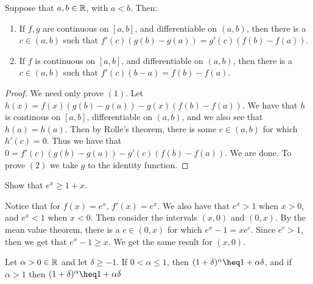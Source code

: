 \begin{theorem}\label{4.3.2}
    Suppose that $a,b \in \mathbb{R}$, with  $a<b$. Then:
        \begin{enumerate}[label=(\arabic*)]
            \item If $f, g$ are continuous on  $[a,b]$, and differentiable on  $(a,b)$, then 
                there is a $c \in (a,b)$ such that $f'(c)(g(b)-g(a))=g'(c)(f(b)-f(a))$.

            \item If $f$ is continuous on  $[a,b]$, and differentiable on  $(a,b)$, then there is 
                a  $c \in (a,b)$ such that $f'(c)(b-a)=f(b)-f(a)$.
        \end{enumerate}
\end{theorem}
\begin{proof}
    We need only prove $(1)$. Let  $h(x)=f(x)(g(b)-g(a))-g(x)(f(b)-f(a))$. We have that 
    $h$ is continous on  $[a,b]$, differentiable on $(a,b)$, and we also see that $h(a)=h(a)$.
    Then by Rolle's theorem, there is some  $c \in (a,b)$ for which $h'(c)=0$. Thus 
    we have that  $0=f'(c)(g(b)-g(a))-g'(c)(f(b)-f(a))$. We are done. To prove $(2)$ 
    we take  $g$ to the identity function.
\end{proof}

\begin{example}
    Show that $e^x \geq 1+x$.		
\end{example}
\begin{solution}
    Notice that for $f(x)=e^x$,  $f'(x)=e^x$. We also have that  $e^x>1$ when  $x>0$, 
    and $e^x<1$ when  $x<0$. Then consider the intervals  $(x,0)$ and $(0,x)$. By the 
    mean value theorem, there is a  $c \in (0,x)$ for which $e^x-1=xe^c$. Since $e^c>1$, then 
    we get that  $e^x-1 \geq x$. We get the same result for  $(x,0)$.
\end{solution}

\begin{theorem}\label{4.3.3}
   Let $\alpha>0 \in \mathbb{R}$ and let  $\delta \geq -1$. If  $0<\alpha \leq 1$, then 
   $(1+\delta)^{\alpha} \heq 1+\alpha\delta$, and if  $\alpha >1$ then $(1+\delta)^{\alpha} \heq 1+\alpha\delta$
\end{theorem}

